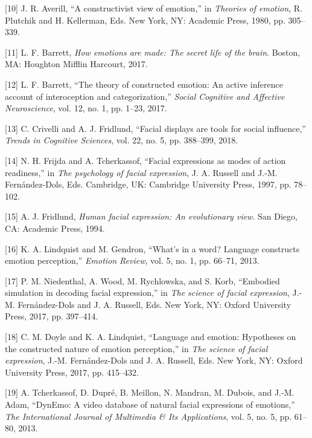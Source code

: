 \documentclass[conference,final,]{IEEEtran}
\begin{document}
\leavevmode\hypertarget{ref-averill1980constructivist}{}%
{[}10{]} J. R. Averill, ``A constructivist view of emotion,'' in
\emph{Theories of emotion}, R. Plutchik and H. Kellerman, Eds. New York,
NY: Academic Press, 1980, pp. 305--339.

\leavevmode\hypertarget{ref-barrett2017emotions}{}%
{[}11{]} L. F. Barrett, \emph{How emotions are made: The secret life of
the brain}. Boston, MA: Houghton Mifflin Harcourt, 2017.

\leavevmode\hypertarget{ref-barrett2017theory}{}%
{[}12{]} L. F. Barrett, ``The theory of constructed emotion: An active
inference account of interoception and categorization,'' \emph{Social
Cognitive and Affective Neuroscience}, vol. 12, no. 1, pp. 1--23, 2017.

\leavevmode\hypertarget{ref-crivelli2018facial}{}%
{[}13{]} C. Crivelli and A. J. Fridlund, ``Facial displays are tools for
social influence,'' \emph{Trends in Cognitive Sciences}, vol. 22, no. 5,
pp. 388--399, 2018.

\leavevmode\hypertarget{ref-frijda1997facial}{}%
{[}14{]} N. H. Frijda and A. Tcherkassof, ``Facial expressions as modes
of action readiness,'' in \emph{The psychology of facial expression}, J.
A. Russell and J.-M. Fernández-Dols, Eds. Cambridge, UK: Cambridge
University Press, 1997, pp. 78--102.

\leavevmode\hypertarget{ref-fridlund1994human}{}%
{[}15{]} A. J. Fridlund, \emph{Human facial expression: An evolutionary
view}. San Diego, CA: Academic Press, 1994.

\leavevmode\hypertarget{ref-lindquist2013s}{}%
{[}16{]} K. A. Lindquist and M. Gendron, ``What's in a word? Language
constructs emotion perception,'' \emph{Emotion Review}, vol. 5, no. 1,
pp. 66--71, 2013.

\leavevmode\hypertarget{ref-niedenthal2017embodied}{}%
{[}17{]} P. M. Niedenthal, A. Wood, M. Rychlowska, and S. Korb,
``Embodied simulation in decoding facial expression,'' in \emph{The
science of facial expression}, J.-M. Fernández-Dols and J. A. Russell,
Eds. New York, NY: Oxford University Press, 2017, pp. 397--414.

\leavevmode\hypertarget{ref-doyle2017language}{}%
{[}18{]} C. M. Doyle and K. A. Lindquist, ``Language and emotion:
Hypotheses on the constructed nature of emotion perception,'' in
\emph{The science of facial expression}, J.-M. Fernández-Dols and J. A.
Russell, Eds. New York, NY: Oxford University Press, 2017, pp. 415--432.

\leavevmode\hypertarget{ref-tcherkassof2013dynemo}{}%
{[}19{]} A. Tcherkassof, D. Dupré, B. Meillon, N. Mandran, M. Dubois,
and J.-M. Adam, ``DynEmo: A video database of natural facial expressions
of emotions,'' \emph{The International Journal of Multimedia \& Its
Applications}, vol. 5, no. 5, pp. 61--80, 2013.
\end{document}
